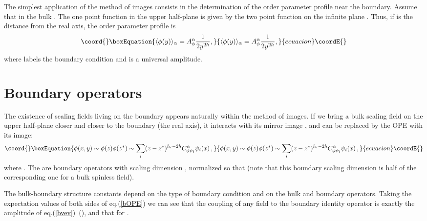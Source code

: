 \documentclass[a4paper,12pt]{report}
\begin{document}
The simplest application of the method of images consists in the determination of the order parameter profile
near the boundary. Assume that in the bulk \coordHE{}. The one point function
\coordHE{} in the upper half-plane is given by the two point function on the infinite plane
\coordHE{}. Thus, if \coordHE{} is the distance from the real axis, the order
parameter profile is
\begin{equation}\coord{}\boxEquation{\label{bvev}
\langle\phi(y)\rangle_{\alpha}=A_{\phi}^{\alpha} \frac{1}{2y^{2h}},
}{\langle\phi(y)\rangle_{\alpha}=A_{\phi}^{\alpha} \frac{1}{2y^{2h}},
}{ecuacion}\coordE{}\end{equation}
where \myHighlight{$\alpha$}\coordHE{} labels the boundary condition and \coordHE{} is a universal amplitude.


\vspace{1cm}


\section{Boundary operators}

The existence of scaling fields living on the boundary appears naturally within the method of images. If we bring
a bulk scaling field \coordHE{} on the upper half-plane closer and closer to the boundary (the real axis), it
interacts with its mirror image \coordHE{}, and can be replaced by the OPE with its image:
\begin{equation}\coord{}\boxEquation{\label{bOPE}
\phi(x,y)\sim\phi(z)\phi(z^{*})\sim\sum_{i}(z-z^{*})^{h_{i}-2h}C_{\phi\psi_{i}}^{\alpha}\psi_{i}(x)\,,
}{\phi(x,y)\sim\phi(z)\phi(z^{*})\sim\sum_{i}(z-z^{*})^{h_{i}-2h}C_{\phi\psi_{i}}^{\alpha}\psi_{i}(x)\,,
}{ecuacion}\coordE{}\end{equation}
where \coordHE{}. The \coordHE{} are boundary operators with scaling dimension \coordHE{}, normalized so
that \coordHE{} (note that this boundary scaling dimension is
half of the corresponding one for a bulk spinless field).

The bulk-boundary structure constants \coordHE{} depend on the type of boundary condition and on
the bulk and boundary operators. Taking the expectation values of both sides of eq.(\ref{bOPE}) we can see that
the coupling of any field to the boundary identity operator is exactly the amplitude of eq.(\ref{bvev})\,
(\coordHE{}), and that \coordHE{} for \coordHE{}.
\end{document}
